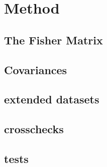 
\section{Method}
\subsection{The Fisher Matrix}
\subsection{Covariances}
\subsection{extended datasets}
\subsection{crosschecks}
\subsection{tests}
